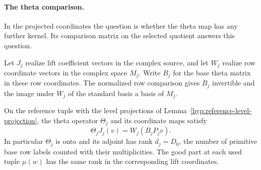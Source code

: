 \paragraph{The theta comparison.}

In the projected coordinates the question is whether the theta map has any further kernel. Its comparison matrix on the selected quotient answers this question.

Let \(J_j\) realize lift coefficient vectors in the complex source, and let \(W_j\) realize row coordinate vectors in the complex space \(M_j\). Write \(B_j\) for the base theta matrix in these row coordinates. The normalized
row comparison gives \(B_j\) invertible and the image under \(W_j\)
of the standard basis a basis of \(M_j\).

\begin{proposition}\label{prop:base-theta-rank}
On the reference tuple with the level projections of
Lemma~\ref{hyp:reference-level-projection}, the theta operator \(\Theta_j\) and its coordinate maps satisfy
\begin{equation}\label{eq:selected-theta-square}
     \Theta_j J_j(v)=W_j(B_j P_j v).
\end{equation}
In particular \(\Theta_j\) is onto and its adjoint has rank
\(d_j=D_0\), the number of primitive base row labels counted
with their multiplicities. The good part at each used tuple
\(\mu(w)\) has the same rank in the corresponding lift coordinates.
\end{proposition}

